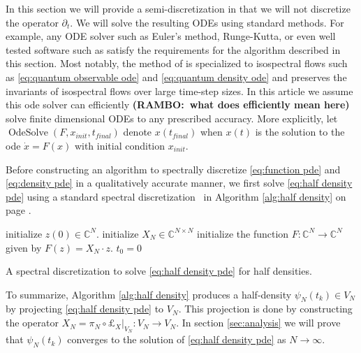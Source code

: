 \documentclass[final,leqno]{siamltex1213}
\newcommand{\ram}[1]{{\normalsize{\textbf{({\color{red}RAMBO:\ }#1)}}}}
\DeclareMathOperator{\OdeSolve}{OdeSolve}
\begin{document}
In this section we will provide a semi-discretization in that we will not discretize the operator $\partial_{t}$.
We will solve the resulting ODEs using standard methods.
For example, any ODE solver such as Euler's method, Runge-Kutta, or even well tested software such as \cite{VODE} satisfy the requirements for the algorithm described in this section.
Most notably, the method of \cite{Calvo1997} is specialized to isospectral flows such as  \eqref{eq:quantum observable ode} and \eqref{eq:quantum density ode} and preserves the invariants of isospectral flows over large time-step sizes.
In this article we assume this ode solver can efficiently \ram{what does efficiently mean here} solve finite dimensional ODEs to any prescribed accuracy.
More explicitly, let $\OdeSolve ( F , x_{init} , t_{final} )$ denote $x(t_{final})$ when $x(t)$ is the solution to the ode $\dot{x} = F(x)$ with initial condition $x_{init}$.

Before constructing an algorithm to spectrally discretize \eqref{eq:function pde} and \eqref{eq:density pde} in a qualitatively accurate manner, we first solve \eqref{eq:half density pde} using a standard spectral discretization~\cite{Boyd2001,NumericalRecipes} in Algorithm \ref{alg:half density} on page \pageref{alg:half density}.

\begin{algorithm}
	initialize $z(0) \in \mathbb{C}^{N}$.\;
	initialize $X_{N} \in \mathbb{C}^{N \times N}$\;
	initialize the function $F: \mathbb{C}^{N} \to \mathbb{C}^{N}$ given by $F(z) = X_{N} \cdot z$.\;
	$t_{0} = 0$\;
	\caption{A spectral discretization to solve \eqref{eq:half density pde} for half densities.} \label{alg:half density}
\end{algorithm}

To summarize, Algorithm \ref{alg:half density} produces a half-density $\psi_{N}(t_{k}) \in V_{N}$ by projecting \eqref{eq:half density pde} to $V_N$.
This projection is done by constructing the operator $X_{N} = \pi_{N} \circ \pounds_{X} |_{V_{N}}: V_{N} \to V_{N}$.
In section \ref{sec:analysis} we will prove that $\psi_{N}(t_{k})$ converges to the solution of \eqref{eq:half density pde} as $N \to \infty$.
\end{document}
